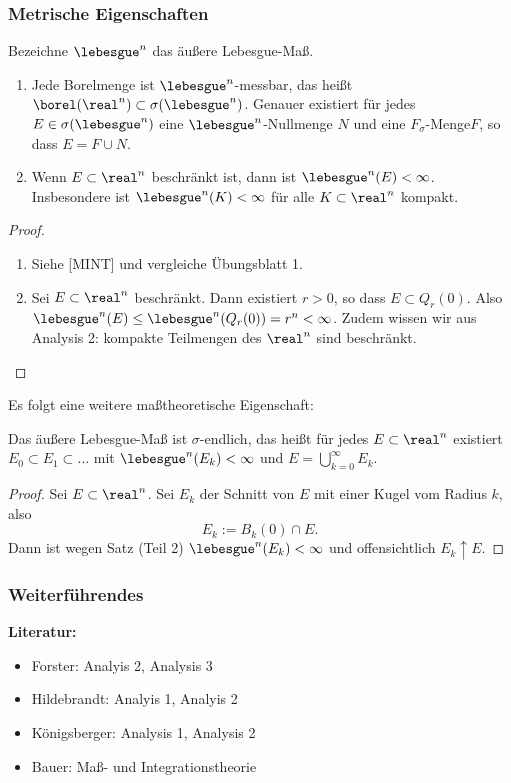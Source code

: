 \subsubsection{Metrische Eigenschaften}
\begin{thm}
 Bezeichne $\lebesgue^n$ das äußere Lebesgue-Maß.
 \begin{enumerate}
  \item Jede Borelmenge ist $\lebesgue^n$-messbar, das heißt $\borel( \real^n ) \subset \sigma(\lebesgue^n)$. Genauer existiert für jedes $E \in \sigma(\lebesgue^n)$ eine $\lebesgue^n$-Nullmenge $N$ und eine $F_\sigma$-Menge\footnotemark $F$, so dass $E = F \cup N$.
  \item Wenn $E \subset \real^n$ beschränkt ist, dann ist $\lebesgue^n(E) < \infty$. Insbesondere ist $\lebesgue^n (K) < \infty$ für alle $K \subset \real^n$ kompakt.
 \end{enumerate}
\end{thm}

\begin{proof}
 \begin{enumerate}
  \item Siehe [MINT] und vergleiche Übungsblatt 1.
  \item Sei $E \subset \real^n$ beschränkt. Dann existiert $r > 0$, so dass $E \subset Q_r(0)$. Also $\lebesgue^n(E) \le \lebesgue^n( Q_r(0) ) = r^n < \infty$. Zudem wissen wir aus Analysis 2: kompakte Teilmengen des $\real^n$ sind beschränkt. \qedhere
 \end{enumerate}
\end{proof}

Es folgt eine weitere maßtheoretische Eigenschaft:
\begin{kor}
 Das äußere Lebesgue-Maß ist $\sigma$-endlich, das heißt für jedes $E \subset \real^n$ existiert $E_0 \subset E_1 \subset \ldots$ mit $\lebesgue^n(E_k) < \infty$ und $E = \bigcup_{k=0}^\infty E_k$.
\end{kor}

\begin{proof}
 Sei $E \subset \real^n$. Sei $E_k$ der Schnitt von $E$ mit einer Kugel vom Radius $k$, also
 \[ E_k := B_k(0) \cap E. \]
 Dann ist wegen Satz (Teil 2) $\lebesgue^n(E_k) < \infty$ und offensichtlich $E_k \uparrow E$.
\end{proof}

\subsubsection*{Weiterführendes}
\textbf{Literatur:}
\begin{itemize}
 \item Forster: Analyis 2, Analysis 3
 \item Hildebrandt: Analyis 1, Analyis 2
 \item Königsberger: Analysis 1, Analysis 2
 \item Bauer: Maß- und Integrationstheorie
\end{itemize}

